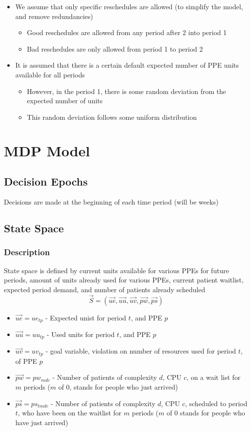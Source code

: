 \documentclass{article}
\begin{document}
\begin{itemize}
	\item We assume that only specific reschedules are allowed (to simplify the model, and remove  redundancies)
		\begin{itemize}
			\item Good reschedules are allowed from any period after 2 into period 1
			\item Bad reschedules are only allowed from period 1 to period 2
		\end{itemize}
	
	\item It is assumed that there is a certain default expected number of PPE units available for all periods
		\begin{itemize}
			\item However, in the period 1, there is some random deviation from the expected number of units
			\item This random deviation follows some uniform distribution
		\end{itemize}
\end{itemize}

\section{MDP Model}
\subsection{Decision Epochs}
Decisions are made at the beginning of each time period (will be weeks)

\subsection{State Space}
\subsubsection{Description}
State space is defined by current units available for various PPEs for future periods, amount of units already used for various PPEs, current patient waitlist, expected period demand, and number of patients already scheduled
\[  \vec{S}  = (\vec{ue}, \vec{uu}, \vec{uv}, \vec{pw}, \vec{ps}) \]
\begin{itemize}
    \item $\vec{ue} = ue_{tp}$ - Expected unist for period $t$, and PPE $p$
    \item $\vec{uu} = uu_{tp}$ - Used units for period $t$, and PPE $p$
    \item $\vec{uv} = uv_{tp}$ - goal variable, violation on number of resources used for period $t$, of PPE $p$
    \item $\vec{pw} = pw_{mdc}$ - Number of patients of complexity $d$, CPU $c$, on a wait list for $m$ periods ($m$ of 0, stands for people who just arrived)
    \item $\vec{ps} = ps_{tmdc}$ - Number of patients of complexity $d$, CPU $c$, scheduled to period $t$, who have been on the waitlist for $m$ periods ($m$ of 0 stands for people who have just arrived)
\end{itemize}
\end{document}
